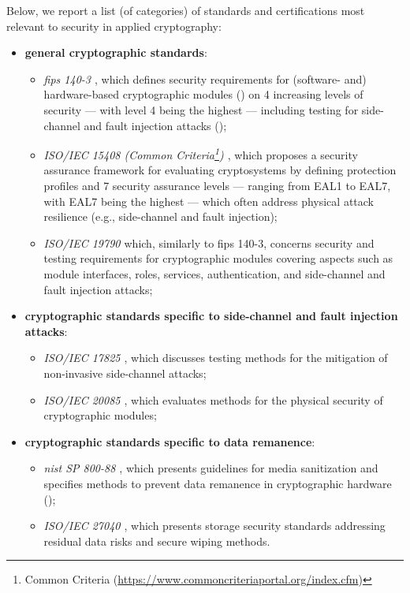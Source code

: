 Below, we report a list (of categories) of standards and certifications most relevant to security in applied cryptography:

\begin{itemize}
	
	\item \textbf{general cryptographic standards}:
	\begin{itemize}
			\item \textit{\gls{fips} 140-3 \cite{nist_security_2019}}, which defines security requirements for (software- and) hardware-based cryptographic modules () on 4 increasing levels of security --- with level 4 being the highest --- including testing for side-channel and fault injection attacks ();
			\item \textit{ISO/IEC 15408 (Common Criteria\footnote{Common Criteria (\url{https://www.commoncriteriaportal.org/index.cfm})}) \cite{iso_information_2022}}, which proposes a security assurance framework for evaluating cryptosystems by defining protection profiles and 7 security assurance levels --- ranging from EAL1 to EAL7, with EAL7 being the highest --- which often address physical attack resilience (e.g., side-channel and fault injection);
			\item \textit{ISO/IEC 19790 \cite{iso_information_2012}} which, similarly to \gls{fips} 140-3, concerns security and testing requirements for cryptographic modules covering aspects such as module interfaces, roles, services, authentication, and side-channel and fault injection attacks;
		\end{itemize} 
	
	\item \textbf{cryptographic standards specific to side-channel and fault injection attacks}:
	\begin{itemize}
			\item \textit{ISO/IEC 17825 \cite{iso_17825_2024}}, which discusses testing methods for the mitigation of non-invasive side-channel attacks;
			\item \textit{ISO/IEC 20085 \cite{iso_20085_2019}}, which evaluates methods for the physical security of cryptographic modules;
		\end{itemize}
	
	\item \textbf{cryptographic standards specific to data remanence}:
	\begin{itemize}
			\item \textit{\gls{nist} SP 800-88 \cite{kissel_guidelines_2014}}, which presents guidelines for media sanitization and specifies methods to prevent data remanence in cryptographic hardware ();
			\item \textit{ISO/IEC 27040 \cite{iso_27040_2024}}, which presents storage security standards addressing residual data risks and secure wiping methods.
		\end{itemize}
	
\end{itemize}


